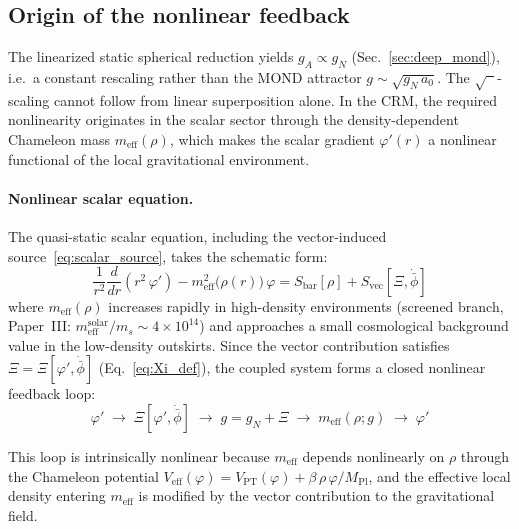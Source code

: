 \documentclass[aps,prd,twocolumn,superscriptaddress,nofootinbib]{revtex4-2}
\begin{document}
\subsection{Origin of the nonlinear feedback}
\label{sec:nonlinear_origin}

The linearized static spherical reduction yields $g_A \propto g_N$ (Sec.~\ref{sec:deep_mond}), i.e.\ a constant rescaling rather than the MOND attractor $g \sim \sqrt{g_N\,a_0}$. The $\sqrt{\phantom{x}}$-scaling cannot follow from linear superposition alone. In the CRM, the required nonlinearity originates in the scalar sector through the density-dependent Chameleon mass $m_{\mathrm{eff}}(\rho)$, which makes the scalar gradient $\varphi'(r)$ a nonlinear functional of the local gravitational environment.

\paragraph{Nonlinear scalar equation.}
The quasi-static scalar equation, including the vector-induced source~\eqref{eq:scalar_source}, takes the schematic form:
\begin{equation}
\frac{1}{r^2}\frac{d}{dr}\!\left(r^2\,\varphi'\right) - m_{\mathrm{eff}}^2\!\big(\rho(r)\big)\,\varphi = S_{\mathrm{bar}}[\rho] + S_{\mathrm{vec}}[\Xi, \dot{\bar{\phi}}]
\label{eq:scalar_chameleon}
\end{equation}
where $m_{\mathrm{eff}}(\rho)$ increases rapidly in high-density environments (screened branch, Paper~III: $m_{\mathrm{eff}}^{\mathrm{solar}}/m_s \sim 4 \times 10^{14}$) and approaches a small cosmological background value in the low-density outskirts. Since the vector contribution satisfies $\Xi = \Xi[\varphi', \dot{\bar{\phi}}]$ (Eq.~\ref{eq:Xi_def}), the coupled system forms a closed nonlinear feedback loop:
\begin{equation}
\varphi' \;\longrightarrow\; \Xi[\varphi', \dot{\bar{\phi}}] \;\longrightarrow\; g = g_N + \Xi \;\longrightarrow\; m_{\mathrm{eff}}(\rho; g) \;\longrightarrow\; \varphi'
\label{eq:feedback_loop}
\end{equation}

This loop is intrinsically nonlinear because $m_{\mathrm{eff}}$ depends nonlinearly on $\rho$ through the Chameleon potential $V_{\mathrm{eff}}(\varphi) = V_{\mathrm{PT}}(\varphi) + \beta\,\rho\,\varphi/M_{\mathrm{Pl}}$, and the effective local density entering $m_{\mathrm{eff}}$ is modified by the vector contribution to the gravitational field.
\end{document}
